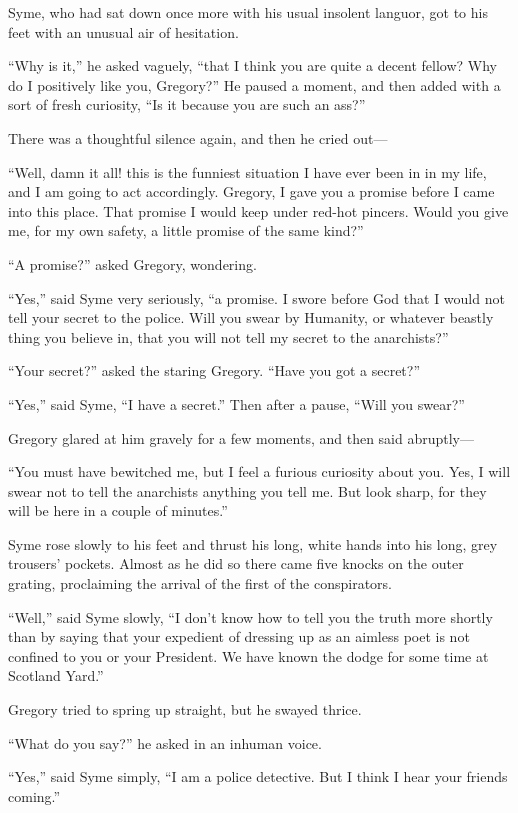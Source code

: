 \documentclass{book}
\begin{document}
Syme, who had sat down once more with his usual insolent languor, got to his feet with an unusual air of hesitation.

“Why is it,” he asked vaguely, “that I think you are quite a decent fellow? Why do I positively like you, Gregory?” He paused a moment, and then added with a sort of fresh curiosity, “Is it because you are such an ass?”

There was a thoughtful silence again, and then he cried out—

“Well, damn it all! this is the funniest situation I have ever been in in my life, and I am going to act accordingly. Gregory, I gave you a promise before I came into this place. That promise I would keep under red-hot pincers. Would you give me, for my own safety, a little promise of the same kind?”

“A promise?” asked Gregory, wondering.

“Yes,” said Syme very seriously, “a promise. I swore before God that I would not tell your secret to the police. Will you swear by Humanity, or whatever beastly thing you believe in, that you will not tell my secret to the anarchists?”

“Your secret?” asked the staring Gregory. “Have you got a secret?”

“Yes,” said Syme, “I have a secret.” Then after a pause, “Will you swear?”

Gregory glared at him gravely for a few moments, and then said abruptly—

“You must have bewitched me, but I feel a furious curiosity about you. Yes, I will swear not to tell the anarchists anything you tell me. But look sharp, for they will be here in a couple of minutes.”

Syme rose slowly to his feet and thrust his long, white hands into his long, grey trousers’ pockets. Almost as he did so there came five knocks on the outer grating, proclaiming the arrival of the first of the conspirators.

“Well,” said Syme slowly, “I don’t know how to tell you the truth more shortly than by saying that your expedient of dressing up as an aimless poet is not confined to you or your President. We have known the dodge for some time at Scotland Yard.”

Gregory tried to spring up straight, but he swayed thrice.

“What do you say?” he asked in an inhuman voice.

“Yes,” said Syme simply, “I am a police detective. But I think I hear your friends coming.”
\end{document}
